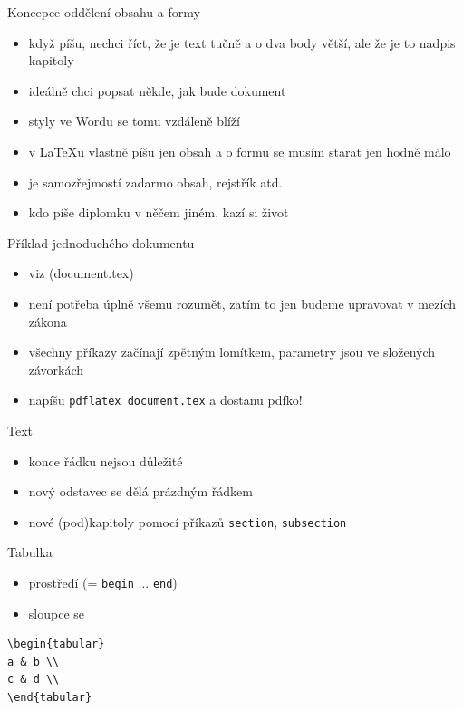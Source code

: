 \documentclass{beamer}
\begin{document}
\begin{frame}{Koncepce oddělení obsahu a formy}
  \begin{itemize}
    \item když píšu, nechci říct, že je text tučně a o dva body větší, ale že je to nadpis kapitoly
    \item ideálně chci popsat někde, jak bude dokument
    \item styly ve Wordu se tomu vzdáleně blíží
    \item v LaTeXu vlastně píšu jen obsah a o formu se musím starat jen hodně málo
    \item je samozřejmostí zadarmo obsah, rejstřík atd.
    \item kdo píše diplomku v něčem jiném, kazí si život
  \end{itemize}
\end{frame}

\begin{frame}{Příklad jednoduchého dokumentu}
  \begin{itemize}
    \item viz (document.tex)
    \item není potřeba úplně všemu rozumět, zatím to jen budeme upravovat v mezích zákona
    \item všechny příkazy začínají zpětným lomítkem, parametry jsou ve složených závorkách
    \item napíšu \texttt{pdflatex document.tex} a dostanu pdfko!
  \end{itemize}
\end{frame}

\begin{frame}{Text}
  \begin{itemize}
    \item konce řádku nejsou důležité
    \item nový odstavec se dělá prázdným řádkem
    \item nové (pod)kapitoly pomocí příkazů \texttt{section}, \texttt{subsection}
  \end{itemize}
\end{frame}

\begin{frame}[fragile]{Tabulka}
  \begin{itemize}
    \item prostředí (= \texttt{begin} ... \texttt{end})
    \item sloupce se
  \end{itemize}
      \scriptsize
  \begin{verbatim}
\begin{tabular}
a & b \\
c & d \\
\end{tabular}
  \end{verbatim}

\end{frame}
\end{document}
